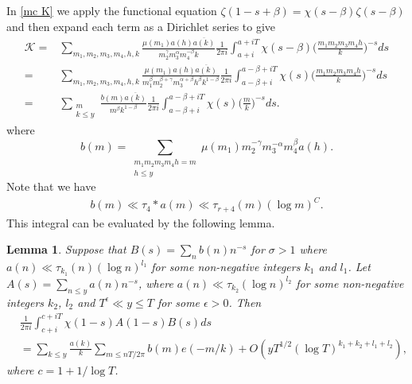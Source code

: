 \documentclass[oneside, 12pt]{amsart}
\newtheorem{lem}[prop]{Lemma}
\theoremstyle{definition}
\newcommand{\mc}{\mathcal}
\newcommand{\ol}{\overline}
\newcommand{\leqs}{\leqslant }
\newcommand{\be}{\begin{equation*}}
\newcommand{\ee}{\end{equation*} }
\newcommand{\ben}{\begin{equation}}
\newcommand{\een}{\end{equation} }
\begin{document}
In \eqref{mc K} we apply the functional equation $\zeta(1-s+\beta)=\chi(s-\beta)\zeta(s-\beta)$ and then expand each term as a Dirichlet series to give
\be
\begin{split}
\mc{K} = & \sum_{m_1,m_2,m_3,m_4,h,k}\frac{\mu(m_1)a(h)\ol{a(k)}}{m_2^\gamma m_3^\alpha m_4^{-\beta} k}
                 \frac{1}{2\pi i}\int_{a+i}^{a+iT} \chi(s-\beta)\bigg(\frac{m_1m_2m_3m_4h}{k}\bigg)^{-s}ds
      \\  = &  \sum_{m_1,m_2,m_3,m_4,h,k}\frac{\mu(m_1)a(h)\ol{a(k)}}{m_1^\beta m_2^{\beta+\gamma}m_3^{\alpha+\beta}h^\beta k^{1-\beta}}
                 \frac{1}{2\pi i}\int_{a-\beta+i}^{a-\beta+iT} \chi(s)\bigg(\frac{m_1m_2m_3m_4h}{k}\bigg)^{-s}ds
      \\  = &  \sum_{\substack{m\\ k\leq y}}\frac{b(m)\ol{a(k)}}{m^\beta k^{1-\beta}}
                 \frac{1}{2\pi i}\int_{a-\beta+i}^{a-\beta+iT} \chi(s)\bigg(\frac{m}{k}\bigg)^{-s}ds.
\end{split}
\ee
where 
\ben\label{Def b}
b(m)=\sum_{\substack{m_1m_2m_3m_4h=m\\h\leqs y}}\mu(m_1)m_2^{-\gamma}m_3^{-\alpha}m_4^\beta a(h).
\een
Note that we have 
\begin{align*}
b(m)\ll \tau_4* a(m)\ll \tau_{r+4}(m)(\log m)^C.
\end{align*}
This integral can be evaluated by the following lemma.
\begin{lem}\label{Integral I}
	Suppose that $B(s)=\sum_{n}b(n)n^{-s}$ for $\sigma>1$ where $a(n)\ll \tau_{k_1}(n)(\log n)^{l_1}$ for some non-negative integers $k_1$ and $l_1$. Let $A(s)=\sum_{n\leq y}a(n)n^{-s}$, where $a(n)\ll \tau_{k_2}(\log n)^{l_2}$ for some non-negative integers $k_2$,  $l_2$ and $T^\epsilon\ll y \leq T$ for some $\epsilon>0$. Then 
	\begin{align*}
	&\frac{1}{2\pi i}\int_{c+i}^{c+iT}\chi(1-s)A(1-s)B(s)ds\\&=\sum_{k\leq y}\frac{a(k)}{k}\sum_{m\leq nT/2\pi}b(m)e(-m/k)+O(yT^{1/2}(\log T)^{k_1+k_2+l_1+l_2}),
	\end{align*} 
where $c=1+1/\log T$.
\end{lem}
\end{document}
